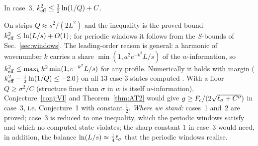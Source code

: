 \begin{conjecture} \conjst
\label{conj:VI}
In case~3, $k_{\mathrm{eff}}^2\le\tfrac12\ln(1/Q)+C$.
\end{conjecture}

On strips $Q\approx s^2/(2L^2)$ and the inequality is the proved bound $k_{\mathrm{eff}}^2\le\ln(L/s)+O(1)$; for periodic windows it follows from the
$S$-bounds of Sec.~\ref{sec:windows}. The leading-order reason is general: a harmonic of wavenumber $k$ carries a share
$\min(1,a^2e^{-k^2}L/s)$ of the $w$-information, so $k_{\mathrm{eff}}^2\le\max_kk^2\min(1,e^{-k^2}L/s)$ for any profile. Numerically it holds with
margin ($k_{\mathrm{eff}}^2-\tfrac12\ln(1/Q)\le-2.0$) on all $13$ case-3 states computed \numst. With a floor $Q\ge\sigma^2/C$ (structure finer than
$\sigma$ in $w$ is itself $w$-information), Conjecture~\ref{conj:VI} and Theorem~\ref{thm:AT2} would give $g\ge F_c/(2\sqrt{\ell_\sigma+C''})$ in case~3,
i.e. Conjecture~1 with constant $\tfrac12$. \emph{Where we stand:} cases~1 and~2 are proved; case~3 is reduced to one inequality, which the
periodic windows satisfy and which no computed state violates; the sharp constant $1$ in case~3 would need, in addition, the balance
$\ln(L/s)\approx\tfrac14\ell_\sigma$ that the periodic windows realise.
